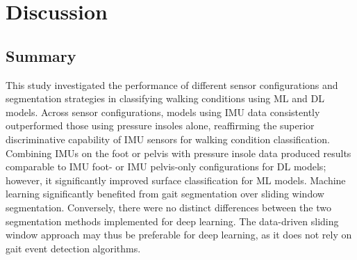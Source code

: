 \documentclass[sensors,article,submit,pdftex,moreauthors]{Definitions/mdpi}
\begin{document}
\FloatBarrier
\section{Discussion}
\subsection{Summary}

This study investigated the performance of different sensor configurations and segmentation strategies in classifying walking conditions using ML and DL models. Across sensor configurations, models using IMU data consistently outperformed those using pressure insoles alone, reaffirming the superior discriminative capability of IMU sensors for walking condition classification. Combining IMUs \textcolor{revision}{on the foot} \textcolor{revision2}{or pelvis} with pressure insole data produced results comparable to \textcolor{revision}{IMU foot\textcolor{revision2}{- or IMU pelvis}}-only configurations for DL \textcolor{revision}{models}; however, \textcolor{revision}{it significantly improved surface classification for ML models}. Machine learning significantly benefited from gait segmentation  over sliding window segmentation. Conversely, there were no distinct differences between the two segmentation methods implemented \textcolor{revision}{for deep learning. The data-driven sliding window approach may thus be preferable \textcolor{revision}{for deep learning}, as it does not rely on gait event detection algorithms. } 
\end{document}
